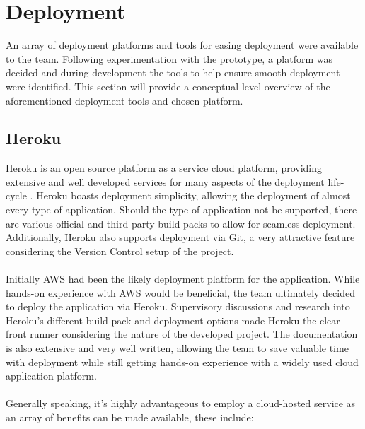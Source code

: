 \section{Deployment}
An array of deployment platforms and tools for easing deployment were available to the team. Following experimentation with the prototype, a platform was decided and during development the tools to help ensure smooth deployment were identified. This section will provide a conceptual level overview of the aforementioned deployment tools and chosen platform.

\subsection{Heroku}
Heroku is an open source platform as a service cloud platform, providing extensive and well developed services for many aspects of the deployment life-cycle \cite{HEROKU}. Heroku boasts deployment simplicity, allowing the deployment of almost every type of application. Should the type of application not be supported, there are various official and third-party build-packs to allow for seamless deployment. Additionally, Heroku also supports deployment via Git, a very attractive feature considering the Version Control setup of the project.

\paragraph{}
Initially AWS had been the likely deployment platform for the application. While hands-on experience with AWS would be beneficial, the team ultimately decided to deploy the application via Heroku. Supervisory discussions and research into Heroku's different build-pack and deployment options made Heroku the clear front runner considering the nature of the developed project. The documentation is also extensive and very well written, allowing the team to save valuable time with deployment while still getting hands-on experience with a widely used cloud application platform.

\paragraph{}
Generally speaking, it's highly advantageous to employ a cloud-hosted service as an array of benefits  can be made available, these include:

